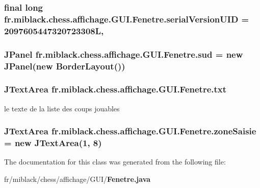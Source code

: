 \subsubsection[{serial\-Version\-U\-I\-D}]{\setlength{\rightskip}{0pt plus 5cm}final long fr.\-miblack.\-chess.\-affichage.\-G\-U\-I.\-Fenetre.\-serial\-Version\-U\-I\-D = 2097605447320723308\-L\hspace{0.3cm}{\ttfamily [static]}, {\ttfamily [private]}}\label{classfr_1_1miblack_1_1chess_1_1affichage_1_1GUI_1_1Fenetre_a352099d39f5a44bbb065a5be6c0df321}
\subsubsection[{sud}]{\setlength{\rightskip}{0pt plus 5cm}J\-Panel fr.\-miblack.\-chess.\-affichage.\-G\-U\-I.\-Fenetre.\-sud = new J\-Panel(new Border\-Layout())\hspace{0.3cm}{\ttfamily [private]}}\label{classfr_1_1miblack_1_1chess_1_1affichage_1_1GUI_1_1Fenetre_a83e7c97fd8455e9e11557f64406be39e}
\subsubsection[{txt}]{\setlength{\rightskip}{0pt plus 5cm}J\-Text\-Area fr.\-miblack.\-chess.\-affichage.\-G\-U\-I.\-Fenetre.\-txt\hspace{0.3cm}{\ttfamily [static]}}\label{classfr_1_1miblack_1_1chess_1_1affichage_1_1GUI_1_1Fenetre_acaf405fbc0ff8294083e70f115aab4ea}
le texte de la liste des coups jouables 
\subsubsection[{zone\-Saisie}]{\setlength{\rightskip}{0pt plus 5cm}J\-Text\-Area fr.\-miblack.\-chess.\-affichage.\-G\-U\-I.\-Fenetre.\-zone\-Saisie = new J\-Text\-Area(1, 8)\hspace{0.3cm}{\ttfamily [private]}}\label{classfr_1_1miblack_1_1chess_1_1affichage_1_1GUI_1_1Fenetre_add243305169fd62b2c60526aff77fe5e}


The documentation for this class was generated from the following file\-:\begin{DoxyCompactItemize}
\item 
fr/miblack/chess/affichage/\-G\-U\-I/{\bf Fenetre.\-java}\end{DoxyCompactItemize}
